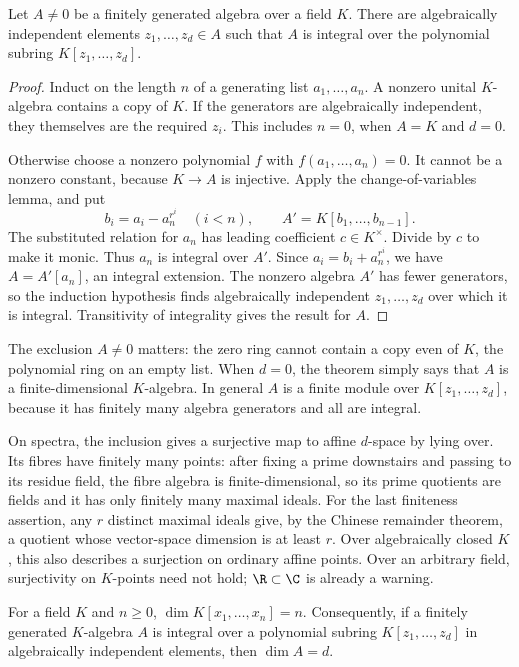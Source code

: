 \begin{theorem}\label{thm:noethernorm}
Let $A\ne0$ be a finitely generated algebra over a field $K$. There are algebraically independent elements $z_1,\ldots,z_d\in A$ such that $A$ is integral over the polynomial subring $K[z_1,\ldots,z_d]$.
\end{theorem}

\begin{proof}
Induct on the length $n$ of a generating list $a_1,\ldots,a_n$. A nonzero unital $K$-algebra contains a copy of $K$. If the generators are algebraically independent, they themselves are the required $z_i$. This includes $n=0$, when $A=K$ and $d=0$.

Otherwise choose a nonzero polynomial $f$ with $f(a_1,\ldots,a_n)=0$. It cannot be a nonzero constant, because $K\to A$ is injective. Apply the change-of-variables lemma, and put
\[
 b_i=a_i-a_n^{r^i}\quad(i<n),\qquad A'=K[b_1,\ldots,b_{n-1}].
\]
The substituted relation for $a_n$ has leading coefficient $c\in K^\times$. Divide by $c$ to make it monic. Thus $a_n$ is integral over $A'$. Since $a_i=b_i+a_n^{r^i}$, we have $A=A'[a_n]$, an integral extension. The nonzero algebra $A'$ has fewer generators, so the induction hypothesis finds algebraically independent $z_1,\ldots,z_d$ over which it is integral. Transitivity of integrality gives the result for $A$.
\end{proof}

The exclusion $A\ne0$ matters: the zero ring cannot contain a copy even of $K$, the polynomial ring on an empty list. When $d=0$, the theorem simply says that $A$ is a finite-dimensional $K$-algebra. In general $A$ is a finite module over $K[z_1,\ldots,z_d]$, because it has finitely many algebra generators and all are integral.

On spectra, the inclusion gives a surjective map to affine $d$-space by lying over. Its fibres have finitely many points: after fixing a prime downstairs and passing to its residue field, the fibre algebra is finite-dimensional, so its prime quotients are fields and it has only finitely many maximal ideals. For the last finiteness assertion, any $r$ distinct maximal ideals give, by the Chinese remainder theorem, a quotient whose vector-space dimension is at least $r$. Over algebraically closed $K$, this also describes a surjection on ordinary affine points. Over an arbitrary field, surjectivity on $K$-points need not hold; $\R\subset\C$ is already a warning.

\begin{theorem}\label{thm:dimpoly}
For a field $K$ and $n\ge0$, $\dim K[x_1,\ldots,x_n]=n$. Consequently, if a finitely generated $K$-algebra $A$ is integral over a polynomial subring $K[z_1,\ldots,z_d]$ in algebraically independent elements, then $\dim A=d$.
\end{theorem}

